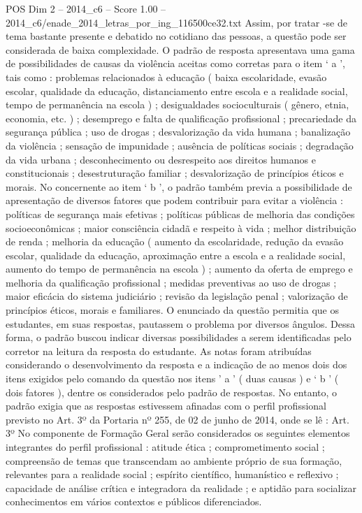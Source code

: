 \begin{textsample}{POS Dim 2 – 2014\_c6 – Score 1.00 – 2014\_c6/enade\_2014\_letras\_por\_ing\_116500ce32.txt}
Assim, por tratar -se de tema bastante presente e debatido no cotidiano das pessoas, a questão pode ser considerada de baixa complexidade.
O padrão de resposta apresentava uma gama de possibilidades de causas da violência aceitas como corretas para o item ‘ a ’, tais como : problemas relacionados à educação ( baixa escolaridade, evasão escolar, qualidade da educação, distanciamento entre escola e a realidade social, tempo de permanência na escola ) ; desigualdades socioculturais ( gênero, etnia, economia, etc. ) ; desemprego e falta de qualificação profissional ; precariedade da segurança pública ; uso de drogas ; desvalorização da vida humana ; banalização da violência ; sensação de impunidade ; ausência de políticas sociais ; degradação da vida urbana ; desconhecimento ou desrespeito aos direitos humanos e constitucionais ; desestruturação familiar ; desvalorização de princípios éticos e morais.
No concernente ao item ‘ b ’, o padrão também previa a possibilidade de apresentação de diversos fatores que podem contribuir para evitar a violência : políticas de segurança mais efetivas ; políticas públicas de melhoria das condições socioeconômicas ; maior consciência cidadã e respeito à vida ; melhor distribuição de renda ; melhoria da educação ( aumento da escolaridade, redução da evasão escolar, qualidade da educação, aproximação entre a escola e a realidade social, aumento do tempo de permanência na escola ) ; aumento da oferta de emprego e melhoria da qualificação profissional ; medidas preventivas ao uso de drogas ; maior eficácia do sistema judiciário ; revisão da legislação penal ; valorização de princípios éticos, morais e familiares.
O enunciado da questão permitia que os estudantes, em suas respostas, pautassem o problema por diversos ângulos.
Dessa forma, o padrão buscou indicar diversas possibilidades a serem identificadas pelo corretor na leitura da resposta do estudante.
As notas foram atribuídas considerando o desenvolvimento da resposta e a indicação de ao menos dois dos itens exigidos pelo comando da questão nos itens ’ a ’ ( duas causas ) e ‘ b ’ ( dois fatores ), dentre os considerados pelo padrão de respostas.
No entanto, o padrão exigia que as respostas estivessem afinadas com o perfil profissional previsto no Art. 3º da Portaria nº 255, de 02 de junho de 2014, onde se lê : Art. 3º No componente de Formação Geral serão considerados os seguintes elementos integrantes do perfil profissional : atitude ética ; comprometimento social ; compreensão de temas que transcendam ao ambiente próprio de sua formação, relevantes para a realidade social ; espírito científico, humanístico e reflexivo ; capacidade de análise crítica e integradora da realidade ; e aptidão para socializar conhecimentos em vários contextos e públicos diferenciados.

\end{textsample}
